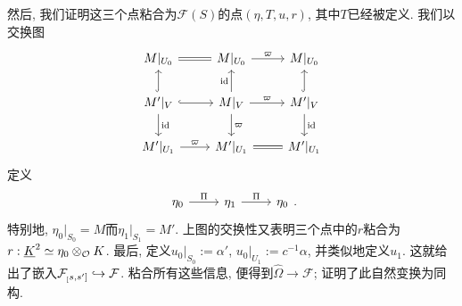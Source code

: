 然后, 我们证明这三个点粘合为$\mathcal{F}(S)$的点$(\eta, T, u, r)$, 其中$T$已经被定义. 我们以交换图\[
    \begin{tikzcd}
        {M|_{U_0}} & {M|_{U_0}} & {M|_{U_0}} \\
        {M'|_V} & {M|_V} & {M'|_V} \\
        {M'|_{U_1}} & {M'|_{U_1}} & {M'|_{U_1}}
        \arrow[Rightarrow, no head, from=1-1, to=1-2]
        \arrow["\varpi", from=1-2, to=1-3]
        \arrow[hook, from=2-1, to=1-1]
        \arrow[hook, from=2-1, to=2-2]
        \arrow["\Id", from=2-1, to=3-1]
        \arrow["\Id", from=2-2, to=1-2]
        \arrow["\varpi", from=2-2, to=2-3]
        \arrow["\varpi", from=2-2, to=3-2]
        \arrow[hook, from=2-3, to=1-3]
        \arrow["\Id", from=2-3, to=3-3]
        \arrow["\varpi", from=3-1, to=3-2]
        \arrow[Rightarrow, no head, from=3-2, to=3-3]
    \end{tikzcd}
\]
定义\[\begin{tikzcd}
	{\eta_0} & {\eta_1} & {\eta_0}
	\arrow["\Pi", from=1-1, to=1-2]
	\arrow["\Pi", from=1-2, to=1-3]
\end{tikzcd}.\] 
特别地, $\eta_0|_{S_0} = M$而$\eta_1|_{S_1} = M'$. 上图的交换性又表明三个点中的$r$粘合为$r : \underline{K}^2\simeq \eta_0\otimes_{\mathcal{O}} K$.
最后, 定义$u_0|_{S_0} := \alpha'$, $u_0|_{U_1} := c^{-1}\alpha$, 并类似地定义$u_1$.
这就给出了嵌入$\mathcal{F}_{_[s, s']}\hookrightarrow\mathcal{F}$.
粘合所有这些信息, 便得到$\hat{\Omega}\to\mathcal{F}$;
\cite[I, 5.6]{BC91}证明了此自然变换为同构.


